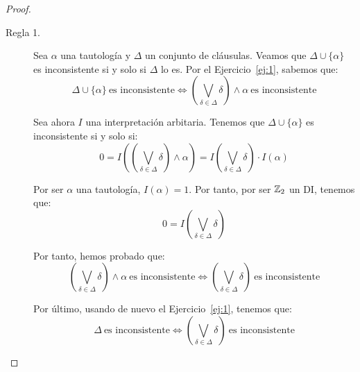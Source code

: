 \begin{teo}
\begin{proof}

         \begin{description}
                \item[Regla 1.] Sea $\alpha$ una tautología y $\Delta$ un conjunto de cláusulas.
                Veamos que $\Delta\cup \{\alpha\}$ es inconsistente si y solo si $\Delta$ lo es.
                Por el Ejercicio~\ref{ej:1}, sabemos que:
                \begin{equation*}
                    \Delta\cup \{\alpha\}\ \text{es inconsistente} \iff \left(\bigvee_{\delta \in \Delta} \delta\right) \land \alpha\ \text{es inconsistente}
                \end{equation*}

                Sea ahora $I$ una interpretación arbitaria. Tenemos que $\Delta\cup \{\alpha\}$ es inconsistente si y solo si:
                \begin{equation*}
                    0 = I\left(\left(\bigvee_{\delta \in \Delta} \delta\right) \land \alpha\right) = I\left(\bigvee_{\delta \in \Delta} \delta\right)\cdot I(\alpha)
                \end{equation*}

                Por ser $\alpha$ una tautología, $I(\alpha) = 1$. Por tanto, por ser $\mathbb{Z}_2$ un DI, tenemos que:
                \begin{equation*}
                    0 = I\left(\bigvee_{\delta \in \Delta} \delta\right)
                \end{equation*}

                Por tanto, hemos probado que:
                \begin{equation*}
                    \left(\bigvee_{\delta \in \Delta} \delta\right) \land \alpha\ \text{es inconsistente}
                    \iff \left(\bigvee_{\delta \in \Delta} \delta\right)\ \text{es inconsistente}
                \end{equation*}

                Por último, usando de nuevo el Ejercicio~\ref{ej:1}, tenemos que:
                \begin{equation*}
                    \Delta\ \text{es inconsistente} \iff \left(\bigvee_{\delta \in \Delta} \delta\right)\ \text{es inconsistente}
                \end{equation*}


\end{description}
\end{proof}
\end{teo}
